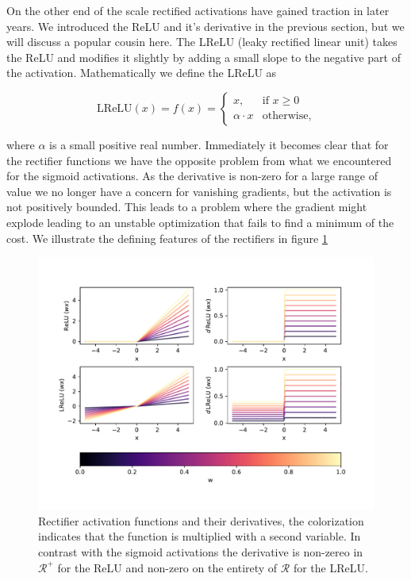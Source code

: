 On the other end of the scale rectified activations have gained traction in later years. We introduced the ReLU and it's derivative in the previous section, but we will discuss a popular cousin here. The LReLU (leaky rectified linear unit) takes the ReLU and modifies it slightly by adding a small slope to the negative part of the activation. Mathematically we define the LReLU as 

\begin{equation}\label{eq:lrelu}
	\text{LReLU} (x) = f(x) = \begin{cases}
	x, & \text{if } x \geq 0 \\
	\alpha\cdot x  & \text{otherwise},
	\end{cases}
\end{equation}

\noindent where $\alpha$ is a small positive real number. Immediately it becomes clear that for the rectifier functions we have the opposite problem from what we encountered for the sigmoid activations. As the derivative is non-zero for a large range of value we no longer have a concern for vanishing gradients, but the activation is not positively bounded. This leads to a problem where the gradient might explode leading to an unstable optimization that fails to find a minimum of the cost. We illustrate the defining features of the rectifiers in figure \ref{fig:elu}

\begin{figure}
\centering
\includegraphics[width=\textwidth]{../figures/activationselus.pdf}
\caption[Rectifier activation functions]{Rectifier activation functions and their derivatives, the colorization indicates that the function is multiplied with a second variable. In contrast with the sigmoid activations the derivative is non-zereo in $\mathcal{R}^+$ for the ReLU and non-zero on the entirety of $\mathcal{R}$ for the LReLU.}\label{fig:elu}
\end{figure}


